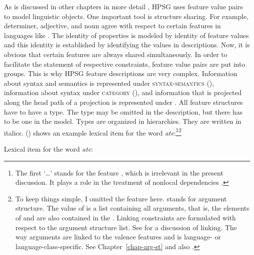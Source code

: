 \documentclass[output=paper,biblatex,babelshorthands,newtxmath,draftmode,colorlinks,citecolor=brown]{langscibook}
\begin{document}
As is discussed in other chapters in more detail
\parencites[Section~\ref{sec-essentials}]{chapters/formal-background}[Section~\ref{prop:sec-elements}]{chapters/properties},
HPSG uses feature value pairs to model linguistic objects. One important tool is structure sharing. For example, determiner, adjective, and noun agree
with respect to certain features in languages like . The identity of properties is modeled by
identity of feature values and this identity is established by identifying the values in descriptions. Now,
it is obvious that certain features are always shared simultaneously. In order to facilitate the statement
of respective constraints, feature value pairs are put into groups. This is why HPSG feature
descriptions are very complex. Information about syntax and semantics is represented under
\textsc{syntax-semantics} (\synsem), information about syntax under \textsc{category} (\cat), and
information that is projected along the head path of a projection is represented under \head. All
feature structures have to have a type. The type may be omitted in the description, but there has to
be one in the model. Types are organized in hierarchies. They are written in italics. ()
shows an example lexical item for the word \emph{ate}:\footnote{
  The first `\ldots' stands for the feature \local, which is irrelevant in the present discussion. It plays
  a role in the treatment of nonlocal dependencies .
}\footnote{
  To keep things simple, I omitted the feature \argst here. \argst stands for argument
  structure. The value of \argst is a list containing all arguments, that is, the elements of \spr
  and \comps are also contained in the \argst. Linking constraints are formulated with respect to
  the argument structure list. See  for a discussion of linking. The way
  arguments are linked to the valence features \spr and \comps is language- or language-class-specific.
  See Chapter~\ref{chap-arg-st} and also .
}

\ea
\label{le-ate}
Lexical item for the word \emph{ate}:\\
\z
\end{document}
